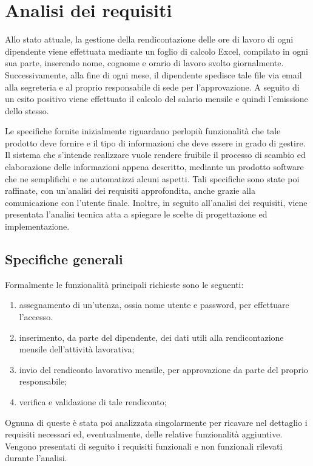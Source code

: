 \chapter{Analisi dei requisiti} \label{chapter:ads}
Allo stato attuale, la gestione della rendicontazione delle ore di lavoro di ogni dipendente viene effettuata mediante un foglio di calcolo Excel, compilato in ogni sua parte, inserendo nome, cognome e orario di lavoro svolto giornalmente. Successivamente, alla fine di ogni mese, il dipendente spedisce tale file via email alla segreteria e al proprio responsabile di sede per l'approvazione. A seguito di un esito positivo viene effettuato il calcolo del salario mensile e quindi l'emissione dello stesso.

Le specifiche fornite inizialmente riguardano perlopiù funzionalità che tale prodotto deve fornire e il tipo di informazioni che deve essere in grado di gestire. Il sistema che s'intende realizzare vuole rendere fruibile il processo di scambio ed elaborazione delle informazioni appena descritto, mediante un prodotto software che ne semplifichi e ne automatizzi alcuni aspetti. Tali specifiche sono state poi raffinate, con un'analisi dei requisiti approfondita, anche grazie alla comunicazione con l'utente finale. Inoltre, in seguito all'analisi dei requisiti, viene presentata l'analisi tecnica atta a spiegare le scelte di progettazione ed implementazione. 

\section{Specifiche generali}
Formalmente le funzionalità principali richieste sono le seguenti:
\begin{enumerate}
    \item assegnamento di un'utenza, ossia nome utente e password, per effettuare l'accesso.
    \item inserimento, da parte del dipendente, dei dati utili alla rendicontazione mensile dell'attività lavorativa;
    \item invio del rendiconto lavorativo mensile, per approvazione da parte del proprio responsabile;
    \item verifica e validazione di tale rendiconto;
\end{enumerate}
Ognuna di queste è stata poi analizzata singolarmente per ricavare nel dettaglio i requisiti necessari ed, eventualmente, delle relative funzionalità aggiuntive. Vengono presentati di seguito i requisiti funzionali e non funzionali rilevati durante l'analisi.

